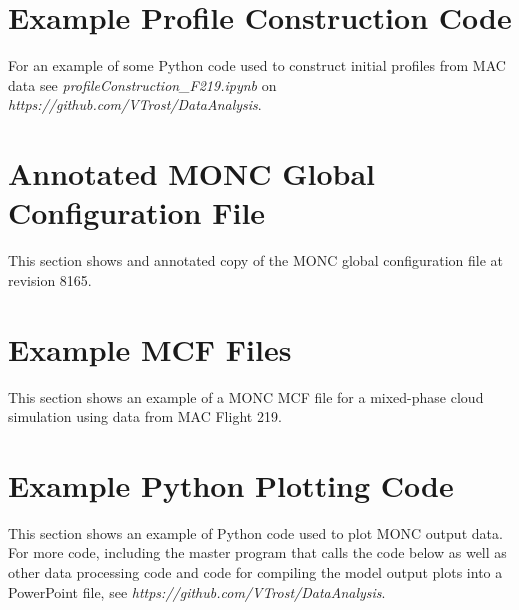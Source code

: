 \newpage
\section{Example Profile Construction Code} \label{ap:profile}
For an example of some Python code used to construct initial profiles from MAC data see \textit{profileConstruction\_F219.ipynb} on \textit{https://github.com/VTrost/DataAnalysis}.


\section{Annotated MONC Global Configuration File} \label{ap:globalConfig}
This section shows and annotated copy of the MONC global configuration file at revision 8165.




\section{Example MCF Files} \label{ap:mcf}
This section shows an example of a MONC MCF file for a mixed-phase cloud simulation using data from MAC Flight 219.




\section{Example Python Plotting Code} \label{ap:py}
This section shows an example of Python code used to plot MONC output data. For more code, including the master program that calls the code below as well as other data processing code and code for compiling the model output plots into a PowerPoint file, see \textit{https://github.com/VTrost/DataAnalysis}.


